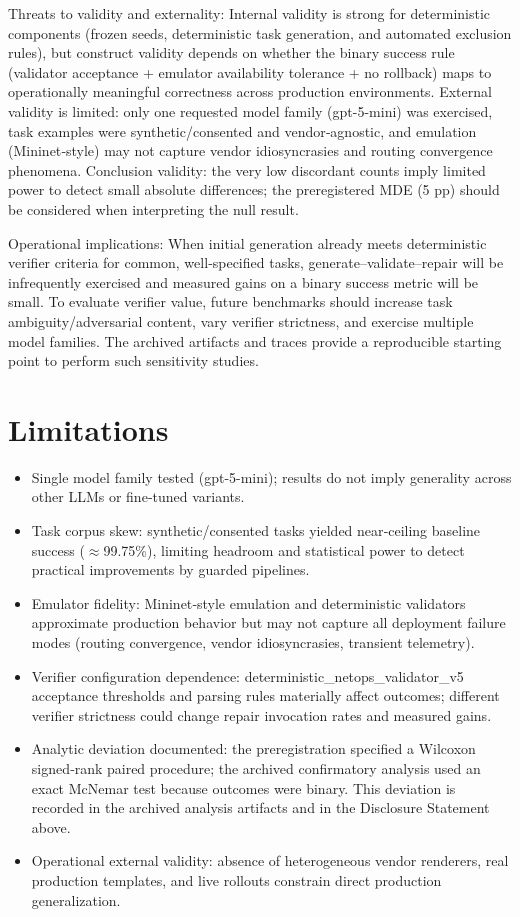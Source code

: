 \documentclass[conference]{IEEEtran}
\begin{document}
Threats to validity and externality: Internal validity is strong for deterministic components (frozen seeds, deterministic task generation, and automated exclusion rules), but construct validity depends on whether the binary success rule (validator acceptance + emulator availability tolerance + no rollback) maps to operationally meaningful correctness across production environments. External validity is limited: only one requested model family (gpt-5-mini) was exercised, task examples were synthetic/consented and vendor‑agnostic, and emulation (Mininet‑style) may not capture vendor idiosyncrasies and routing convergence phenomena. Conclusion validity: the very low discordant counts imply limited power to detect small absolute differences; the preregistered MDE (5 pp) should be considered when interpreting the null result.

Operational implications: When initial generation already meets deterministic verifier criteria for common, well‑specified tasks, generate--validate--repair will be infrequently exercised and measured gains on a binary success metric will be small. To evaluate verifier value, future benchmarks should increase task ambiguity/adversarial content, vary verifier strictness, and exercise multiple model families. The archived artifacts and traces provide a reproducible starting point to perform such sensitivity studies.

\section{Limitations}
\begin{itemize}
\item Single model family tested (gpt-5-mini); results do not imply generality across other LLMs or fine‑tuned variants.
\item Task corpus skew: synthetic/consented tasks yielded near‑ceiling baseline success (\ensuremath{\approx}99.75\%), limiting headroom and statistical power to detect practical improvements by guarded pipelines.
\item Emulator fidelity: Mininet‑style emulation and deterministic validators approximate production behavior but may not capture all deployment failure modes (routing convergence, vendor idiosyncrasies, transient telemetry).
\item Verifier configuration dependence: deterministic\_netops\_validator\_v5 acceptance thresholds and parsing rules materially affect outcomes; different verifier strictness could change repair invocation rates and measured gains.
\item Analytic deviation documented: the preregistration specified a Wilcoxon signed‑rank paired procedure; the archived confirmatory analysis used an exact McNemar test because outcomes were binary. This deviation is recorded in the archived analysis artifacts and in the Disclosure Statement above.
\item Operational external validity: absence of heterogeneous vendor renderers, real production templates, and live rollouts constrain direct production generalization.
\end{itemize}
\end{document}
